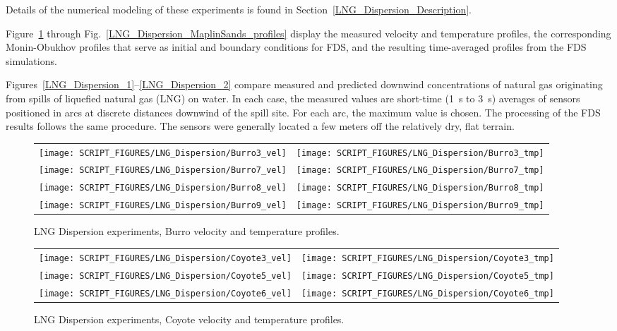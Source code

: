 Details of the numerical modeling of these experiments is found in Section~\ref{LNG_Dispersion_Description}.

Figure~\ref{LNG_Dispersion_Burro_profiles} through Fig.~\ref{LNG_Dispersion_MaplinSands_profiles} display the measured velocity and temperature profiles, the corresponding Monin-Obukhov profiles that serve as initial and boundary conditions for FDS, and the resulting time-averaged profiles from the FDS simulations.

Figures~\ref{LNG_Dispersion_1}--\ref{LNG_Dispersion_2} compare measured and predicted downwind concentrations of natural gas originating from spills of liquefied natural gas (LNG) on water. In each case, the measured values are short-time (1~s to 3~s) averages of sensors positioned in arcs at discrete distances downwind of the spill site. For each arc, the maximum value is chosen. The processing of the FDS results follows the same procedure. The sensors were generally located a few meters off the relatively dry, flat terrain.

\newpage

\begin{figure}[p]
\begin{tabular*}{\textwidth}{l@{\extracolsep{\fill}}r}
\texttt{[image: SCRIPT\_FIGURES/LNG\_Dispersion/Burro3\_vel]} &
\texttt{[image: SCRIPT\_FIGURES/LNG\_Dispersion/Burro3\_tmp]} \\
\texttt{[image: SCRIPT\_FIGURES/LNG\_Dispersion/Burro7\_vel]} &
\texttt{[image: SCRIPT\_FIGURES/LNG\_Dispersion/Burro7\_tmp]} \\
\texttt{[image: SCRIPT\_FIGURES/LNG\_Dispersion/Burro8\_vel]} &
\texttt{[image: SCRIPT\_FIGURES/LNG\_Dispersion/Burro8\_tmp]} \\
\texttt{[image: SCRIPT\_FIGURES/LNG\_Dispersion/Burro9\_vel]} &
\texttt{[image: SCRIPT\_FIGURES/LNG\_Dispersion/Burro9\_tmp]}
\end{tabular*}
\caption[LNG Dispersion experiments, Burro velocity and temperature profiles]{LNG Dispersion experiments, Burro velocity and temperature profiles.}
\label{LNG_Dispersion_Burro_profiles}
\end{figure}

\begin{figure}[p]
\begin{tabular*}{\textwidth}{l@{\extracolsep{\fill}}r}
\texttt{[image: SCRIPT\_FIGURES/LNG\_Dispersion/Coyote3\_vel]} &
\texttt{[image: SCRIPT\_FIGURES/LNG\_Dispersion/Coyote3\_tmp]} \\
\texttt{[image: SCRIPT\_FIGURES/LNG\_Dispersion/Coyote5\_vel]} &
\texttt{[image: SCRIPT\_FIGURES/LNG\_Dispersion/Coyote5\_tmp]} \\
\texttt{[image: SCRIPT\_FIGURES/LNG\_Dispersion/Coyote6\_vel]} &
\texttt{[image: SCRIPT\_FIGURES/LNG\_Dispersion/Coyote6\_tmp]}
\end{tabular*}
\caption[LNG Dispersion experiments, Coyote velocity and temperature profiles]{LNG Dispersion experiments, Coyote velocity and temperature profiles.}
\label{LNG_Dispersion_Coyote_profiles}
\end{figure}

